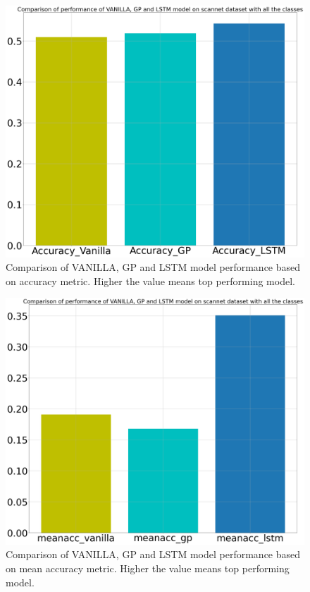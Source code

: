 
	\begin{figure}
		\centering
		\includegraphics[width=12cm]{images/all_classes_acc.png}
		\caption{Comparison of VANILLA, GP and LSTM model performance based on  accuracy metric. Higher the value means top performing model.}
		\label{fig:unet_model_metric_comparison_all_classes}
	\end{figure}

	\begin{figure}
		\centering
		\includegraphics[width=12cm]{images/all_classes_meanacc.png}
		\caption{Comparison of VANILLA, GP and LSTM model performance based on mean accuracy metric. Higher the value means top performing model.}
		\label{fig:unet_model_metric_comparison_all_classes}
	\end{figure}

